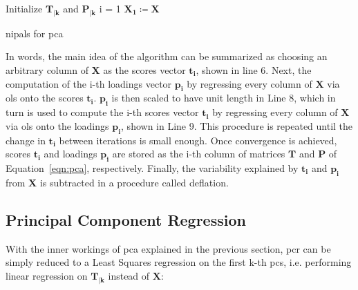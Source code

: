 \begin{algorithm}[H]
	\DontPrintSemicolon
	\label{algo:pca-nipals}
	\SetAlgoLined
	Initialize $\mathbf{T_{|k}}$ and $\mathbf{P_{|k}}$\;
	i = 1\;
	$\mathbf{X_1 \coloneqq X}$\;
	
	
	\caption{\acrfull{nipals} for \acrshort{pca}}
\end{algorithm}

In words, the main idea of the algorithm can be summarized as choosing an arbitrary column of $\mathbf{X}$ as the scores vector $\mathbf{t_i}$, shown in line 6. Next, the computation of the i-th loadings vector $\mathbf{p_i}$ by regressing every column of $\mathbf{X}$ via \acrshort{ols} onto the scores $\mathbf{t_i}$.  $\mathbf{p_i}$ is then scaled to have unit length in Line 8, which in turn is used to compute the i-th scores vector $\mathbf{t_i}$ by regressing every column of $\mathbf{X}$ via \acrshort{ols} onto the loadings $\mathbf{p_i}$, shown in Line 9. This procedure is repeated until the change in $\mathbf{t_i}$ between iterations is small enough. Once convergence is achieved, scores $\mathbf{t_i}$ and loadings $\mathbf{p_i}$ are stored as the i-th column of matrices $\mathbf{T}$ and $\mathbf{P}$ of Equation~\ref{eqn:pca}, respectively. Finally, the variability explained by $\mathbf{t_i}$ and $\mathbf{p_i}$ from $\mathbf{X}$ is subtracted in a procedure called deflation.

\subsection{Principal Component Regression}
\label{sec:pcr}

With the inner workings of \acrshort{pca} explained in the previous section, \acrshort{pcr} can be simply reduced to a Least Squares regression on the first k-th \acrshort{pc}s, i.e. performing linear regression on $\mathbf{T_{|k}}$ instead of $\mathbf{X}$:
	
